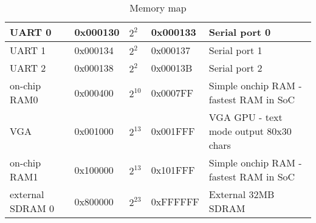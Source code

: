 \begin{table}[h]
\begin{tabular}{|l|l|l|l|l|}
        UART 0              & 0x000130      & $2^{2}$       & 0x000133     & Serial port 0                                  \\ \hline
        UART 1              & 0x000134      & $2^{2}$       & 0x000137     & Serial port 1                                  \\ \hline
        UART 2              & 0x000138      & $2^{2}$       & 0x00013B     & Serial port 2                                  \\ \hline
        on-chip RAM0        & 0x000400      & $2^{10}$      & 0x0007FF     & Simple onchip RAM - fastest RAM in SoC         \\ \hline
        VGA                 & 0x001000      & $2^{13}$      & 0x001FFF     & VGA GPU - text mode output 80x30 chars         \\ \hline
        on-chip RAM1        & 0x100000      & $2^{13}$      & 0x101FFF     & Simple onchip RAM - fastest RAM in SoC         \\ \hline
        external SDRAM 0    & 0x800000      & $2^{23}$      & 0xFFFFFF     & External 32MB SDRAM                            \\ \hline
    \end{tabular}
    \caption{Memory map}
    \label{tab:memory_map}
\end{table}
